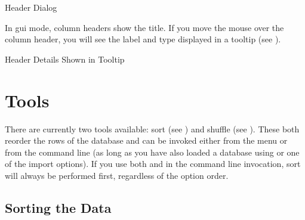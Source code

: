  {%
 }
 {Header Dialog}

In \gls{gui} mode, column headers show the
title. If you move the mouse over the column header, you will see the
label and type displayed in a tooltip (see 
).

 {%
 }
 {Header Details Shown in Tooltip}

\chapter{Tools}\label{sec:tools}

There are currently two tools available: sort (see )
and shuffle (see ). These both reorder the rows of the
database and can be invoked either from the  menu
or from the command line (as long as
you have also loaded a database using  or one of the
import options). If you use both  and 
in the command line invocation, sort will always be performed first, 
regardless of the option order.

\section{Sorting the Data}\label{sec:sort}

